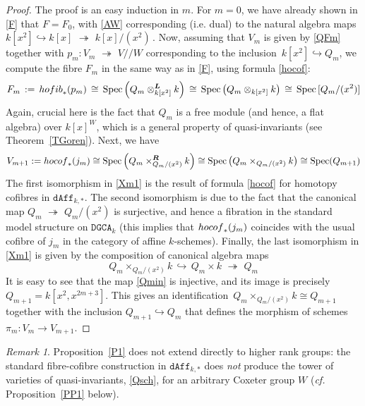 \documentclass[11pt]{amsart}
\theoremstyle{definition}
\theoremstyle{remark}
\newtheorem{remark}[theorem]{Remark}
\numberwithin{equation}{section}
\newcommand{\onto}{\,\,\twoheadrightarrow\,\,}
\newcommand{\la}{\label}
\newcommand{\Spec}{\mathrm{Spec}}
\newcommand{\into}{\hookrightarrow}
\def\bs#1{\boldsymbol{#1}}
\def\L{\boldsymbol{L}}
\def\dgca{\mathtt{DGCA}}
\def\dAff{\mathtt{dAff}}
\begin{document}
\begin{proof} The proof is an easy induction in $m$. For $m=0$, we have already shown  in \eqref{F} that 
$ F = F_0 $, with \eqref{AW} corresponding (i.e. dual) to the natural algebra maps $ k[x^2] \into k[x] \onto k[x]/(x^2)\,$. Now, assuming that $V_m$ is given by \eqref{QFm} together with $p_m: V_m \onto V/\!/W $
corresponding to the inclusion $\, k[x^2] \into Q_m $, we compute the fibre $F_m$
in the same way as in \eqref{F}, using formula \eqref{hocof}:
%
$$
F_m \,:= \,{\rm hofib}_*(p_m)\, 
\cong \,\Spec\left(Q_m \otimes^{\L}_{k[x^2]} k\right) \,
\cong \,\Spec\left(Q_m \otimes_{k[x^2]} k\right)\,
\cong\,  \Spec\,[Q_m/(x^2)]
$$
%
Again, crucial here is the fact that $ Q_m $ is a free module (and hence, a flat algebra)
over $k[x]^W$, which is a general property of quasi-invariants (see Theorem~\ref{TGoren}).
Next,  we have
%
\begin{equation}\la{Xm1}
V_{m+1} :=  {\rm hocof}_*(j_m)  \cong  \Spec \left(Q_m \times^{\bs{R}}_{Q_m/(x^2)} k\right) 
\cong \Spec \left(Q_m \times_{Q_m/(x^2)} k\right) \cong \Spec(Q_{m+1})
\end{equation}
%
The first isomorphism in \eqref{Xm1} is the result of formula \eqref{hocof} for homotopy cofibres in $ \dAff_{k,\ast} $. The second isomorphism is due to the fact that the canonical map $ Q_m \onto Q_m/(x^2) $ is surjective, and hence a fibration in the standard model structure on $ \dgca_k $ (this implies that
$ {\rm hocof}_*(j_m) $ coincides with the usual cofibre of $ j_m $ in the category of affine $k$-schemes). Finally, the last isomorphism in \eqref{Xm1} is given by the composition of canonical algebra maps
%
\begin{equation}\la{Qmin}
Q_m \times_{Q_m/(x^2)} k\,\into \,Q_m \times k \onto Q_m 
\end{equation}
%
It is easy to see that the map \eqref{Qmin} is injective, and its image is precisely
$ Q_{m+1} = k[x^2, x^{2m+3}] $. This gives an identification $\, Q_m \times_{Q_m/(x^2)} k \cong Q_{m+1}\,$ together with the inclusion $ Q_{m+1} \into Q_m $ that defines the morphism of 
schemes  $\pi_m: V_{m} \to V_{m+1} $.
\end{proof}
%
%
\begin{remark}
\la{Rem14}
Proposition~\ref{P1} does not extend directly to higher rank groups: the standard fibre-cofibre construction in $\dAff_{k,\ast} $ does {\it not} produce the tower of varieties of quasi-invariants, \eqref{Qsch}, for an arbitrary Coxeter group $W$ ({\it cf.} Proposition~\ref{PP1} below). 
\end{remark}
\end{document}
